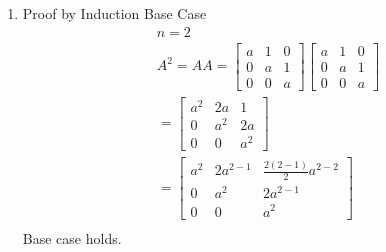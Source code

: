 \documentclass[11pt]{article}
\begin{document}
	\begin{enumerate}[{\bf Q1.}]
		
		\item
		Proof by Induction \newline
			Base Case
			$$
			\begin{aligned}
			& n=2 \\
			& A^2=A A=\left[\begin{array}{lll}
			a & 1 & 0 \\
			0 & a & 1 \\
			0 & 0 & a
			\end{array}\right]\left[\begin{array}{lll}
			a & 1 & 0 \\
			0 & a & 1 \\
			0 & 0 & a
			\end{array}\right] \\
			& =\left[\begin{array}{ccc}
			a^2 & 2 a & 1 \\
			0 & a^2 & 2 a \\
			0 & 0 & a^2
			\end{array}\right] \\
			& =\left[\begin{array}{ccc}
			a^2 & 2 a^{2-1} & \frac{2(2-1)}{2} a^{2-2} \\
			0 & a^2 & 2 a^{2-1} \\
			0 & 0 & a^2
			\end{array}\right] \\
			&
			\end{aligned}
			$$
			Base case holds. \newline


\end{enumerate}
\end{document}
